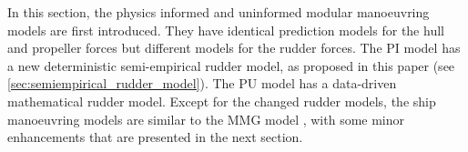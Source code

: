 In this section, the physics informed and uninformed modular manoeuvring models are first introduced.
They have identical prediction models for the hull and propeller forces but different models for the rudder forces. The PI model has a new deterministic semi-empirical rudder model, as proposed in this paper (see \autoref{sec:semiempirical_rudder_model}). The PU model has a data-driven mathematical rudder model. 
Except for the changed rudder models, the ship manoeuvring models are similar to the MMG model \citep{yasukawa_introduction_2015}, with some minor enhancements that are presented in the next section.